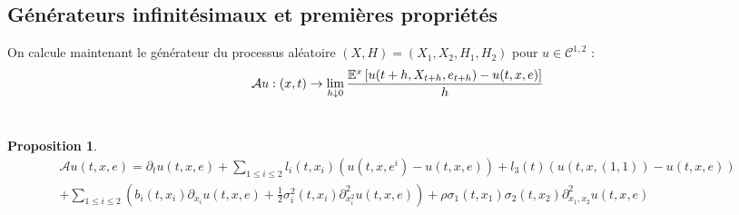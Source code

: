 \documentclass[a4paper]{article}
\newtheorem{proposition}[theorem]{Proposition}
\theoremstyle{definition}
\theoremstyle{remark}
\begin{document}
\subsection{Générateurs infinitésimaux et premières propriétés}
On calcule maintenant le générateur du processus aléatoire $(X, H) = (X_{1}, X_{2}, H_{1}, H_{2})$ pour $u \in \mathcal{C}^{1, 2}$ :
\begin{equation*}
\mathcal{A}u : (x,t)
\rightarrow \space \lim_{h\downarrow 0} \frac {\mathbb{E}^{x}\left[u(t+h, X_{t+h}, e_{t+h}) - u(t,x,e) \right]}{h}
\end{equation*}
\\
\begin{proposition}
\begin{multline}
\mathcal{A}u(t,x,e) = \partial_{t}  u(t,x,e) + \sum \limits_{1\leq i\leq2}l_i(t,x_i)(u(t,x,e^i) - u(t,x,e)) + l_3(t)(u(t,x,(1,1)) - u(t,x,e))\\
 + \sum \limits_{1\leq i\leq2} \left( b_i(t,x_i)\partial_{x_i} u(t,x,e) + \frac{1}{2}\sigma_i^2(t,x_i)\partial^2_{x_i^2}u(t,x,e) \right) + \rho \sigma_1(t,x_1)\sigma_2(t,x_2)\partial^2_{x_1,x_2}u(t,x,e) 
\end{multline}
\end{proposition}
 ~~\\ 
\end{document}

